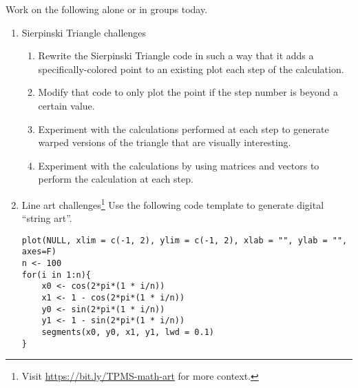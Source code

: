\documentclass[11pt]{article}
\begin{document}
Work on the following alone or in groups today.
\begin{enumerate}
\item Sierpinski Triangle challenges
\begin{enumerate}
\item Rewrite the Sierpinski Triangle code in such a way that it adds a specifically-colored point to an existing plot each step of the calculation.
\item Modify that code to only plot the point if the step number is beyond a certain value.
\item Experiment with the calculations performed at each step to generate warped versions of the triangle that are visually interesting.
\item Experiment with the calculations by using matrices and vectors to perform the calculation at each step.
\end{enumerate}
\item Line art challenges\footnote{Visit \url{https://bit.ly/TPMS-math-art} for more context.} Use the following code template to generate digital ``string art''.
\begin{verbatim}
plot(NULL, xlim = c(-1, 2), ylim = c(-1, 2), xlab = "", ylab = "", axes=F)
n <- 100
for(i in 1:n){
	x0 <- cos(2*pi*(1 * i/n))
	x1 <- 1 - cos(2*pi*(1 * i/n))
	y0 <- sin(2*pi*(1 * i/n))
	y1 <- 1 - sin(2*pi*(1 * i/n))
	segments(x0, y0, x1, y1, lwd = 0.1)
}
\end{verbatim}
\end{enumerate}
\end{document}
